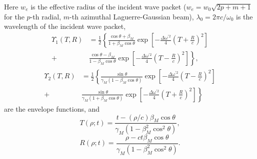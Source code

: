 \documentclass[10pt, a4paper, twoside, openright]{report}
\begin{document}
Here $ w_e $ is the effective radius of the incident wave packet ($ w_e = w_0 \sqrt{2p + m + 1}$ for the $ p $-th radial, $ m $-th azimuthal Laguerre-Gaussian beam), $ \lambda_0 = 2 \pi c / \omega_0 $ is the wavelength of the incident wave packet,
\begin{equation}\label{eq:envelope_function_1}
\begin{aligned}
\Upsilon_1 \left(T, R \right) & = \frac{1}{2} \left\lbrace \frac{\cos \theta + \beta_M}{1 + \beta_M \cos \theta} \exp \left[- \frac{\Delta \omega^{\prime 2}}{4} \left( T + \frac{R}{c} \right)^2 \right] \right. \\
+ & \left. \frac{\cos \theta - \beta_M}{1 - \beta_M \cos \theta} \exp \left[- \frac{\Delta \omega^{\prime 2}}{4} \left( T - \frac{R}{c} \right)^2 \right] \right\rbrace,
\end{aligned}
\end{equation}\vspace{2mm}
\begin{equation}\label{eq:envelope_function_2}
\begin{aligned}
\Upsilon_2 \left(T, R \right) & = \frac{1}{2} \left\lbrace \frac{\sin \theta}{\gamma_M \left( 1 - \beta_M \cos \theta \right) } \exp \left[- \frac{\Delta \omega^{\prime 2}}{4} \left( T - \frac{R}{c} \right)^2 \right] \right. \\
+ & \left. \frac{\sin \theta}{\gamma_M \left( 1 + \beta_M \cos \theta \right) } \exp \left[- \frac{\Delta \omega^{\prime 2}}{4} \left( T + \frac{R}{c} \right)^2 \right] \right\rbrace
\end{aligned}
\end{equation}
are the envelope functions, and
\begin{equation}\label{eq:T}
T \left(\rho; t \right) = \frac{t - \left(\rho / c\right) \beta_M \cos \theta}{\gamma_M \left( 1 - \beta_M^2 \cos^2 \theta \right)},
\end{equation}
\begin{equation}\label{eq:R}
R \left(\rho; t \right) = \frac{\rho - c t \beta_M \cos \theta}{\gamma_M \left( 1 - \beta_M^2 \cos^2 \theta \right)}.
\end{equation}
\end{document}
